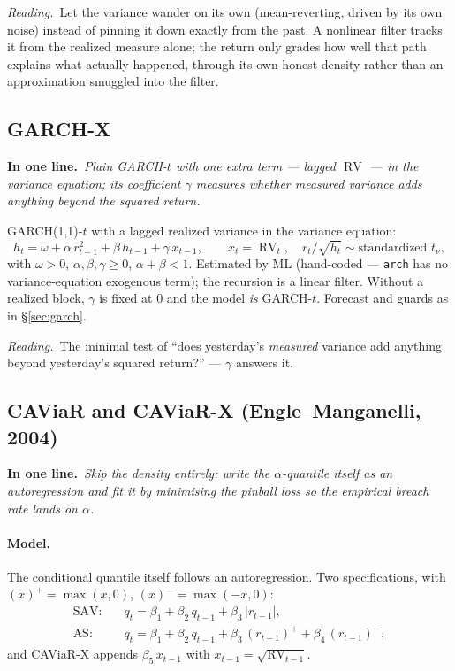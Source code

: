\documentclass[11pt,a4paper]{article}
\newcommand{\RV}{\operatorname{RV}}
\newcommand{\intuition}[1]{\par\smallskip\noindent\textit{Reading.}\ #1\par\smallskip}
\newcommand{\inbrief}[1]{\par\noindent\textbf{In one line.}\ \textit{#1}\par\smallskip}
\begin{document}
\intuition{Let the variance wander on its own (mean-reverting, driven by its
own noise) instead of pinning it down exactly from the past. A nonlinear
filter tracks it from the realized measure alone; the return only grades how
well that path explains what actually happened, through its own honest
density rather than an approximation smuggled into the filter.}

\subsection{GARCH-X}

\inbrief{Plain GARCH-$t$ with one extra term --- lagged $\RV$ --- in the
variance equation; its coefficient $\gamma$ measures whether measured variance
adds anything beyond the squared return.}

GARCH(1,1)-$t$ with a lagged realized variance in the variance equation:
\begin{equation}
  h_t = \omega + \alpha\,r_{t-1}^2 + \beta\,h_{t-1} + \gamma\,x_{t-1},
  \qquad x_t = \RV_t,\quad r_t/\sqrt{h_t}\sim\text{standardized }t_\nu,
\end{equation}
with $\omega>0$, $\alpha,\beta,\gamma\ge0$, $\alpha+\beta<1$. Estimated by ML
(hand-coded --- \texttt{arch} has no variance-equation exogenous term); the
recursion is a linear filter. Without a realized block, $\gamma$ is fixed at $0$
and the model \emph{is} GARCH-$t$. Forecast and guards as in \S\ref{sec:garch}.

\intuition{The minimal test of ``does yesterday's \emph{measured} variance add
anything beyond yesterday's squared return?'' --- $\gamma$ answers it.}

\subsection{CAViaR and CAViaR-X (Engle--Manganelli, 2004)}

\inbrief{Skip the density entirely: write the $\alpha$-quantile itself as an
autoregression and fit it by minimising the pinball loss so the empirical breach
rate lands on $\alpha$.}

\paragraph{Model.} The conditional quantile itself follows an autoregression.
Two specifications, with $(x)^{+}=\max(x,0)$, $(x)^{-}=\max(-x,0)$:
\begin{align}
  \text{SAV:}\quad & q_t = \beta_1 + \beta_2\,q_{t-1} + \beta_3\,|r_{t-1}|,\\
  \text{AS:}\quad  & q_t = \beta_1 + \beta_2\,q_{t-1} + \beta_3\,(r_{t-1})^{+} + \beta_4\,(r_{t-1})^{-},
\end{align}
and CAViaR-X appends $\beta_5\,x_{t-1}$ with $x_{t-1}=\sqrt{\RV_{t-1}}$.
\end{document}
